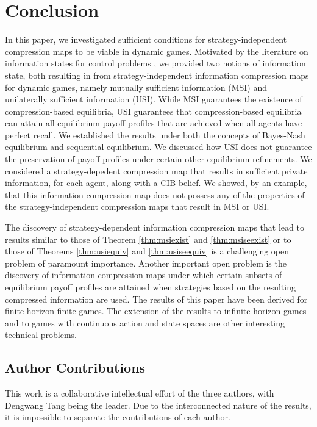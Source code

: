 \documentclass[pdflatex,sn-basic]{sn-jnl}
\theoremstyle{thmstyleone}%
\theoremstyle{thmstyletwo}%
\theoremstyle{thmstylethree}%
\begin{document}
\section{Conclusion}\label{sec:suffinfo:conclusion}
In this paper, we investigated sufficient conditions for strategy-independent compression maps to be viable in dynamic games. Motivated by the literature on information states for control problems \citep{kumar1986stochastic,mahajan2016decentralized,subramanian2020approximate}, we provided two notions of information state, {both resulting in from strategy-independent information} compression maps for dynamic games, namely mutually sufficient information (MSI) and unilaterally sufficient information (USI). While MSI guarantees the existence of compression-based equilibria, USI guarantees that compression-based equilibria can attain all equilibrium payoff profiles that are achieved when all agents have perfect recall. We established the results under both the concepts of Bayes-Nash equilibrium and sequential equilibrium. We discussed how USI does not guarantee the preservation of payoff profiles under certain other equilibrium refinements. {We considered a strategy-depedent compression map that results in sufficient private information, for each agent, along with a CIB belief. We showed, by an example, that this information compression map does not possess any of the properties of the strategy-independent compression maps that result in MSI or USI.}

{The discovery of strategy-dependent information compression maps that lead to results similar to those of Theorem \ref{thm:msiexist} and \ref{thm:msiseexist} or to those of Theorems \ref{thm:usiequiv} and \ref{thm:usiseequiv} is a challenging open problem of paramount importance. Another important open problem is the discovery of information compression maps under which certain subsets of equilibrium payoff profiles are attained when strategies based on the resulting compressed information are used. The results of this paper have been derived for finite-horizon finite games. The extension of the results to infinite-horizon games and to games with continuous action and state spaces are other interesting technical problems}.


\subsection*{Author Contributions}
This work is a collaborative intellectual effort of the three authors, with Dengwang Tang being the leader. Due to the interconnected nature of the results, it is impossible to separate the contributions of each author.
\end{document}
